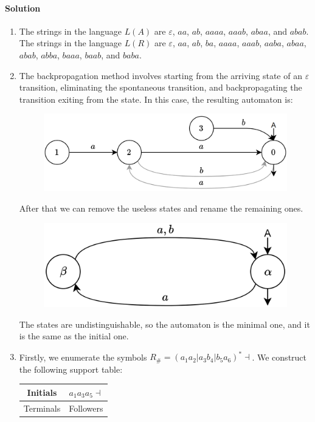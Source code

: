 \paragraph*{Solution}
\begin{enumerate}
    \item The strings in the language $L(A)$ are $\varepsilon$, $aa$, $ab$, $aaaa$, $aaab$, $abaa$, and $abab$. 
        The strings in the language $L(R)$ are $\varepsilon$, $aa$, $ab$, $ba$, $aaaa$, $aaab$, $aaba$, $abaa$, $abab$, $abba$, $baaa$, $baab$, and $baba$. 
    \item The backpropagation method involves starting from the arriving state of an $\varepsilon$ transition, eliminating the spontaneous transition, and backpropagating the transition exiting from the state. 
        In this case, the resulting automaton is:
        \begin{figure}[H]
            \centering
            \includegraphics[width=0.5\linewidth]{images/FSA2a.png}
        \end{figure}
        After that we can remove the useless states and rename the remaining ones. 
        \begin{figure}[H]
            \centering
            \includegraphics[width=0.5\linewidth]{images/FSA3a.png}
        \end{figure}
        The states are undistinguishable, so the automaton is the minimal one, and it is the same as the initial one. 
    \item Firstly, we enumerate the symbols $R_{\#}=\left( a_1a_2|a_3b_4|b_5a_6 \right)^{*}\dashv$. 
        We construct the following support table: 
        \begin{table}[H]
            \centering
            \begin{tabular}{cc}
            Initials                       & $a_1a_3a_5\dashv$              \\ \hline
            \multicolumn{1}{c|}{Terminals} & Followers                      \\

\end{tabular}
\end{table}
\end{enumerate}

